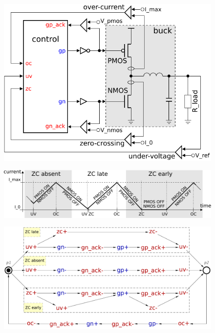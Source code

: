 \documentclass[british, journal]{IEEEtran}
\begin{document}
\begin{figure}[H]
\begin{centering}
\subfloat
{\includegraphics[scale=0.7]{Images/schematic-buck}}
\par
\subfloat
{\includegraphics[scale=0.6]{Images/spec-buck}}
\par
\end{centering}
\vspace{-3mm}
\end{figure}

\begin{figure}[H]
	\begin{centering}
		\includegraphics[scale=0.23]{Images/stg-buck}
		\par
		\par\end{centering}
	\vspace{-3mm}
\end{figure}
\end{document}
